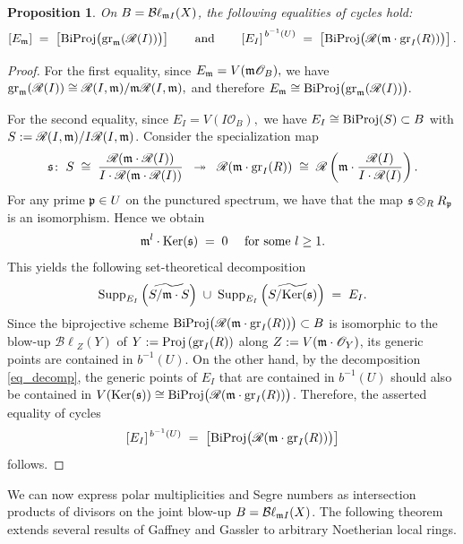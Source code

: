 \documentclass[a4paper, 11pt]{amsart}
\newcommand{\Bl}{{\mathcal{B}\ell}}
\newcommand{\mm}{{\normalfont\mathfrak{m}}}
\newcommand{\pp}{{\normalfont\mathfrak{p}}}
\newcommand{\Ker}{\normalfont\text{Ker}}
\newcommand{\Supp}{\normalfont\text{Supp}}
\newcommand{\Rees}{\mathscr{R}}
\newcommand{\OO}{\mathscr{O}}
\newcommand{\gr}{{\normalfont\text{gr}}}
\newcommand{\Proj}{\normalfont\text{Proj}}
\newcommand{\biProj}{{\normalfont\text{BiProj}}}
\newtheorem{proposition}[proposition]{Proposition}
\theoremstyle{definition}
\def\surjects{\twoheadrightarrow}
\begin{document}
	\begin{proposition}
		\label{prop:joint-models}
		On $B = \Bl_{\mm I}(X)$, the following equalities of cycles hold:
		$$
		\left[E_\mm\right] \;=\; \left[\biProj\big(\gr_\mm(\Rees(I))\big)\right]
		\qquad\text{and}\qquad
		\left[E_I\right]^{\,b^{-1}(U)} \;=\; \left[\biProj\big(\Rees(\mm \cdot\gr_I(R))\big)\right].
		$$
	\end{proposition}
	\begin{proof}
		For the first equality, since
		$
		E_\mm = V(\mm\OO_B),
		$
		we have
		$
		\gr_\mm(\Rees(I)) \cong \Rees(I,\mm)/\mm\Rees(I,\mm),
		$
		and therefore
		$
		E_\mm \cong \biProj\big(\gr_\mm(\Rees(I))\big).
		$
		
		For the second equality, since
		$
		E_I = V(I\OO_B),
		$
		we have $E_I\cong \biProj(S) \subset B$ with $	S:=\Rees(I,\mm)/I\Rees(I,\mm)$. 
		Consider the specialization map 
		$$
		\mathfrak{s} \colon \;  S \;\cong\; \frac{\Rees(\mm \cdot \Rees(I))}{I \cdot \Rees(\mm \cdot \Rees(I))} \;\;\surjects\;\; \Rees(\mm \cdot\gr_I(R)) \;\cong\; \Rees\left(\mm \cdot\frac{\Rees(I)}{I\cdot \Rees(I)}\right).
		$$
		For any prime $\pp \in U$ on the punctured spectrum, we have that the map $\mathfrak{s} \otimes_R R_\pp$ is an isomorphism. 
		Hence we obtain 
		$$
		\mm^l \cdot \Ker(\mathfrak{s}) \;=\; 0 \quad \text{ for some $l \ge 1$}.
		$$
		This yields the following set-theoretical decomposition 
		\begin{equation}
			\label{eq_decomp}
			\Supp_{E_I}\left(\widetilde{S/\mm \cdot S}\right) \;\cup\; \Supp_{E_I}\left(\widetilde{S/\Ker(\mathfrak{s})}\right) \;=\; E_I.
		\end{equation}
		Since the biprojective scheme $\biProj\big(\Rees(\mm \cdot\gr_I(R))\big) \subset B$ is isomorphic to the blow-up $\Bl_Z(Y)$ of $Y := \Proj\left(\gr_I(R)\right)$ along $Z := V(\mm \cdot \OO_Y)$, its generic points are contained in $b^{-1}(U)$.
		On the other hand, by the decomposition \autoref{eq_decomp}, the generic points of $E_I$ that are contained in $b^{-1}(U)$ should also be contained in $V(\Ker(\mathfrak{s})) \cong \biProj\big(\Rees(\mm \cdot\gr_I(R))\big)$.
		Therefore, the asserted equality of cycles
		$$
		[E_I]^{\,b^{-1}(U)} \;=\; \left[\biProj\big(\Rees(\mm \cdot\gr_I(R))\big)\right]
		$$
		follows. 
	\end{proof}
	
	
	We can now express polar multiplicities and Segre numbers as intersection products of divisors on the joint blow-up $B = \Bl_{\mm I}(X)$.
	The following theorem extends several results of Gaffney and Gassler \cite{GG} to arbitrary Noetherian local rings. 
	
\end{document}
